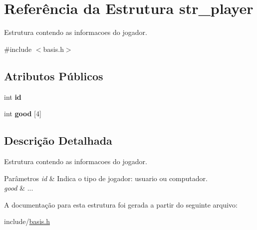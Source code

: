 \hypertarget{structstr__player}{\section{\-Referência da \-Estrutura str\-\_\-player}
\label{structstr__player}
}


\-Estrutura contendo as informacoes do jogador.  




{\ttfamily \#include $<$basis.\-h$>$}

\subsection*{\-Atributos \-Públicos}
\begin{DoxyCompactItemize}
\item 
\hypertarget{structstr__player_a5d79d4b326032ea379c3c7a9614226fb}{int {\bfseries id}}\label{structstr__player_a5d79d4b326032ea379c3c7a9614226fb}

\item 
\hypertarget{structstr__player_a80cb4c90efb08267862ab49cdd15d07b}{int {\bfseries good} \mbox{[}4\mbox{]}}\label{structstr__player_a80cb4c90efb08267862ab49cdd15d07b}

\end{DoxyCompactItemize}


\subsection{\-Descrição \-Detalhada}
\-Estrutura contendo as informacoes do jogador. 


\begin{DoxyParams}{\-Parâmetros}
{\em id} & \-Indica o tipo de jogador\-: usuario ou computador.\\
\hline
{\em good} & ... \\
\hline
\end{DoxyParams}


\-A documentação para esta estrutura foi gerada a partir do seguinte arquivo\-:\begin{DoxyCompactItemize}
\item 
include/\hyperlink{basis_8h}{basis.\-h}\end{DoxyCompactItemize}
